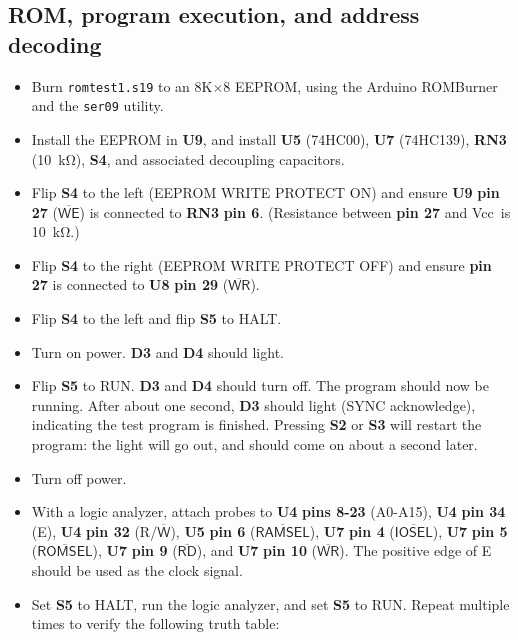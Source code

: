 \documentclass[letterpaper,11pt]{article}
\newcommand{\net}[1]{\textsf{#1}}
\newcommand{\Net}[1]{\ensuremath{\overline{\textsf{#1}}}}
\newcommand{\Wbar}{\ensuremath{\overline{\textsf{W}}}}
\newcommand{\Vcc}{\net{Vcc}}
\newcommand{\pin}[1]{\textbf{pin #1}}
\newcommand{\pins}[1]{\textbf{pins #1}}
\newcommand{\rpin}[2]{\refdes{#1} \pin{#2}}
\newcommand{\rnpin}[3]{\refdes{#1} \pin{#2} (\net{#3})}
\newcommand{\rNpin}[3]{\refdes{#1} \pin{#2} (\Net{#3})}
\newcommand{\rnpins}[3]{\refdes{#1} \pins{#2} (\net{#3})}
\newcommand{\refdes}[1]{\textbf{#1}}
\newcommand{\kohm}[1]{\SI{#1}{\kilo\ohm}}
\begin{document}
\subsection{ROM, program execution, and address decoding}
\begin{itemize}
\item Burn \texttt{romtest1.s19} to an 8K$\times$8 EEPROM, using the Arduino ROMBurner and the \texttt{ser09} utility.
\item Install the EEPROM in \refdes{U9}, and install \refdes{U5} (74HC00), \refdes{U7} (74HC139), \refdes{RN3} (\kohm{10}), \refdes{S4}, and associated decoupling capacitors.
\item Flip \refdes{S4} to the left (EEPROM WRITE PROTECT ON) and ensure \rNpin{U9}{27}{WE} is connected to \rpin{RN3}{6}. (Resistance between \pin{27} and \Vcc\ is \kohm{10}.)
\item Flip \refdes{S4} to the right (EEPROM WRITE PROTECT OFF) and ensure \pin{27} is connected to \rNpin{U8}{29}{WR}.
\item Flip \refdes{S4} to the left and flip \refdes{S5} to HALT.
\item Turn on power. \refdes{D3} and \refdes{D4} should light.
\item Flip \refdes{S5} to RUN. \refdes{D3} and \refdes{D4} should turn off. The program should now be running. After about one second, \refdes{D3} should light (SYNC acknowledge), indicating the test program is finished. Pressing \refdes{S2} or \refdes{S3} will restart the program: the light will go out, and should come on about a second later.
\item Turn off power.
\item With a logic analyzer, attach probes to \rnpins{U4}{8-23}{A0-A15}, \rnpin{U4}{34}{E}, \rnpin{U4}{32}{R/\Wbar}, \rNpin{U5}{6}{RAMSEL}, \rNpin{U7}{4}{IOSEL}, \rNpin{U7}{5}{ROMSEL}, \rNpin{U7}{9}{RD}, and \rNpin{U7}{10}{WR}. The positive edge of \net{E} should be used as the clock signal.
\item Set \refdes{S5} to HALT, run the logic analyzer, and set \refdes{S5} to RUN. Repeat multiple times to verify the following truth table:


\end{itemize}
\end{document}
